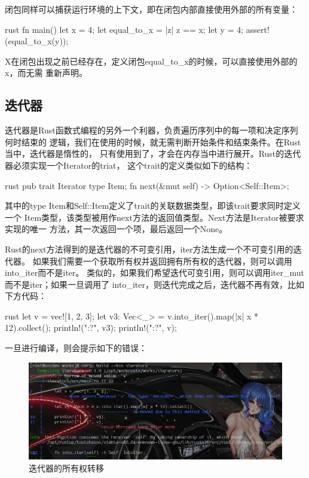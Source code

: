闭包同样可以捕获运行环境的上下文，即在闭包内部直接使用外部的所有变量：
\begin{code-block}{rust}
fn main() {
    let x = 4;
    let equal_to_x = |z| z == x;
    let y = 4;
    assert!(equal_to_x(y));
}
\end{code-block}
X在闭包出现之前已经存在，定义闭包equal\_to\_x的时候，可以直接使用外部的x，而无需
重新声明。

\subsection{迭代器}
迭代器是Rust函数式编程的另外一个利器，负责遍历序列中的每一项和决定序列何时结束的
逻辑，我们在使用的时候，就无需判断开始条件和结束条件。在Rust当中，迭代器是惰性的，
只有使用到了，才会在内存当中进行展开。Rust的迭代器必须实现一个Iterator的triat，
这个trait的定义类似如下的结构：
\begin{code-block}{rust}
pub trait Iterator {
    type Item;
    fn next(&mut self) -> Option<Self::Item>;
}
\end{code-block}
其中的type Item和Self::Item定义了trait的关联数据类型，即该trait要求同时定义一个
Item类型，该类型被用作next方法的返回值类型。Next方法是Iterator被要求实现的唯一
方法，其一次返回一个项，最后返回一个None。

Rust的next方法得到的是迭代器的不可变引用，iter方法生成一个不可变引用的迭代器。
如果我们需要一个获取所有权并返回拥有所有权的迭代器，则可以调用into\_iter而不是iter。
类似的，如果我们希望迭代可变引用，则可以调用iter\_mut而不是iter；如果一旦调用了
into\_iter，则迭代完成之后，迭代器不再有效，比如下方代码：
\begin{code-block}{rust}
let v = vec![1, 2, 3];
let v3: Vec<_> = v.into_iter().map(|x| x * 12).collect();
println!("{:?}", v3);
println!("{:?}", v);
\end{code-block}
一旦进行编译，则会提示如下的错误：
\begin{figure}[H]
  \centering
  \includegraphics[width=\linewidth]{rust_iter_move.png}
  \caption{迭代器的所有权转移}
  \label{fig:rust_iter_move}
\end{figure}

